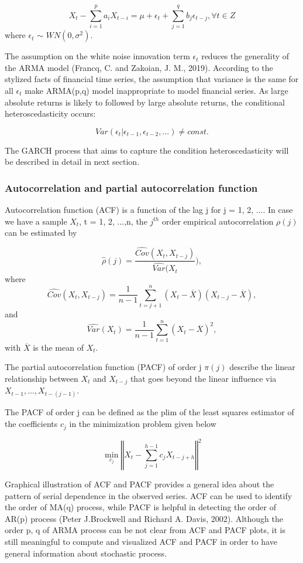 \documentclass[12pt,a4paper]{article}
\numberwithin{equation}{section}
\begin{document}
\[ X_t  - \sum_{i=1}^{p} a_i X_{t-i} = \mu + \epsilon_t + \sum_{j=1}^{q} b_j \epsilon_{t-j} ,\forall t \in Z  \]
where $\epsilon_t$ $\sim$ $WN(0, \sigma^2)$.

The assumption on the white noise innovation term $\epsilon_t$ reduces the generality of the ARMA model (Francq, C. and Zakoian, J. M., 2019). According to the stylized facts of financial time series, the assumption that variance is the same for all $\epsilon_t$ make ARMA(p,q) model inappropriate to model financial series. As large absolute returns is likely to followed by large absolute returns, the conditional heteroscedasticity occurs:

\[ Var(\epsilon_t | \epsilon_{t-1}, \epsilon_{t-2}, ...) \neq const.\]

 The GARCH process that aims to capture the condition heteroscedasticity will be described in detail in next section.
 
 \subsubsection{Autocorrelation and partial autocorrelation function}
Autocorrelation function (ACF) is a function of the lag j for j = 1, 2, .... In case we have a sample $X_t$, t = 1, 2, ...,n, the $j^{th}$ order empirical autocorrelation $\rho(j)$ can be estimated by 

\[\hat{\rho}(j) = \frac{\widehat{Cov} (X_t, X_{t-j})}{\widehat{Var} (X_t}),\]
where 
\[\widehat{Cov} (X_t, X_{t-j}) = \frac{1}{n-1} \sum_{t=j+1}^{n} (X_t - \overline{X}) (X_{t-j} -\overline{X}),\]
and
\[\widehat{Var}(X_t) = \frac{1}{n-1} \sum_{t=1}^{n} (X_t - \overline{X})^2, \]
with $\overline{X}$ is the mean of $X_t$.

The partial autocorrelation function (PACF) of order j  $\pi(j)$ describe the linear relationship between $X_t$ and $X_{t-j}$ that goes beyond the linear influence via $X_{t-1},..., X_{t-(j-1)}$.

The PACF of order j can be defined as the plim of the least squares estimator of the coefficients $c_j$ in the minimization problem given below

\[\min_{c_j} \left\Vert X_t - \sum_{j=1}^{h-1} c_j X_{t-j+h} \right\Vert^2\]

Graphical illustration of ACF and PACF provides a general idea about the pattern of serial dependence in the observed series. ACF can be used to identify the order of MA(q) process, while PACF is helpful in detecting the order of AR(p) process (Peter J.Brockwell and Richard A. Davis, 2002). Although the order p, q of ARMA process can be not clear from ACF and PACF plots, it is still meaningful to compute and visualized ACF and PACF in order to have general information about stochastic process. 
\end{document}
